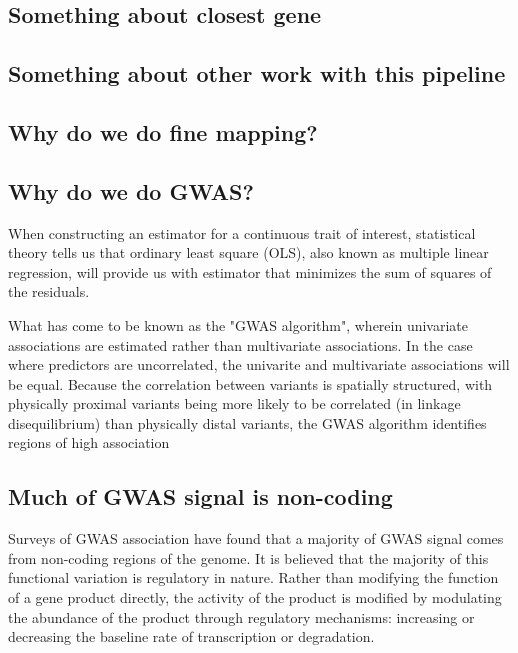 \subsection*{Something about closest gene}
\label{sec:org76964d1}




\subsection*{Something about other work with this pipeline}
\label{sec:orge66998a}




\subsection*{Why do we do fine mapping?}
\label{sec:org5f4032d}

\subsection*{Why do we do GWAS?}
\label{sec:orgaf8c4b4}

When constructing an estimator for a continuous trait of interest, statistical theory tells us that ordinary least square (OLS),
 also known as multiple linear regression, will provide us with estimator that minimizes the sum of squares of the residuals.

What has come to be known as the "GWAS algorithm", wherein univariate associations are estimated rather than multivariate associations.
In the case where predictors are uncorrelated, the univarite and multivariate associations will be equal.  Because the correlation between variants is 
spatially structured, with physically proximal variants being more likely to be correlated (in linkage disequilibrium) than physically distal variants, 
the GWAS algorithm identifies regions of high association


\subsection*{Much of GWAS signal is non-coding}
\label{sec:org3ac0b01}

Surveys of GWAS association have found that a majority of GWAS signal comes from non-coding regions of the genome.  It is believed that the majority 
of this functional variation is regulatory in nature.  Rather than modifying the function of a gene product directly, the activity of the product is modified
by modulating the abundance of the product through regulatory mechanisms: increasing or decreasing the baseline rate of transcription or degradation.  

